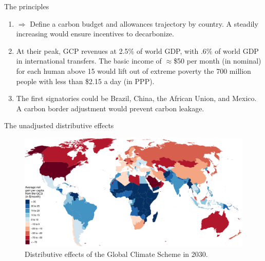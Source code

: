 \documentclass[aspectratio=169,xcolor=dvipsnames, 11pt,mathserif]{beamer}
\begin{document}
\begin{frame}{The principles}
    \begin{enumerate}[<+->]
        \item {}
        \bbvsp \ip $\Rightarrow$ Define a carbon budget and allowances trajectory by country.
        \ip A steadily increasing  would ensure incentives to decarbonize.
        \ee
        \item {}
        \bbvsp \ip At their peak, GCP revenues at 2.5\% of world GDP, with .6\% of world GDP in international transfers. 
        \ip The basic income of $\approx$\$50 per month (in nominal) for each human above 15 would lift out of extreme poverty the 700 million people with less than \$2.15 a day (in PPP).
        \ee
        \item {}
        \bbvsp \ip The first signatories could be Brazil, China, the African Union, and Mexico. %
        \ip A carbon border adjustment would prevent carbon leakage. \ee %
    \end{enumerate}
\end{frame}

\begin{frame}{The unadjusted distributive effects}
    \begin{figure}
        \centering 
        \caption{Distributive effects of the Global Climate Scheme in 2030.}
        \includegraphics[height=.8\textheight]{../figures/maps/mean_gain_2030.pdf} 
    \end{figure}        
\end{frame}
\end{document}
